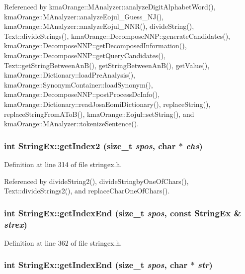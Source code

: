Referenced by kmaOrange::MAnalyzer::analyzeDigitAlphabetWord(), kmaOrange::MAnalyzer::analyzeEojul\_\-Guess\_\-NJ(), kmaOrange::MAnalyzer::analyzeEojul\_\-NNR(), divideString(), Text::divideStrings(), kmaOrange::DecomposeNNP::generateCandidates(), kmaOrange::DecomposeNNP::getDecomposedInformation(), kmaOrange::DecomposeNNP::getQueryCandidates(), Text::getStringBetweenAnB(), getStringBetweenAnB(), getValue(), kmaOrange::Dictionary::loadPreAnalysis(), kmaOrange::SynonymContainer::loadSynonym(), kmaOrange::DecomposeNNP::postProcessDcInfo(), kmaOrange::Dictionary::readJosaEomiDictionary(), replaceString(), replaceStringFromAToB(), kmaOrange::Eojul::setString(), and kmaOrange::MAnalyzer::tokenizeSentence().\hypertarget{classStringEx_85a03ab5f3b7c39a8895fe2c0abfd794}{
\subsubsection[{getIndex2}]{\setlength{\rightskip}{0pt plus 5cm}int StringEx::getIndex2 (size\_\-t {\em spos}, \/  char $\ast$ {\em chs})}}
\label{classStringEx_85a03ab5f3b7c39a8895fe2c0abfd794}




Definition at line 314 of file stringex.h.

Referenced by divideString2(), divideStringbyOneOfChars(), Text::divideStrings2(), and replaceCharOneOfChars().\hypertarget{classStringEx_82f845f34f93c0976c65128787a13251}{
\subsubsection[{getIndexEnd}]{\setlength{\rightskip}{0pt plus 5cm}int StringEx::getIndexEnd (size\_\-t {\em spos}, \/  const {\bf StringEx} \& {\em strex})}}
\label{classStringEx_82f845f34f93c0976c65128787a13251}




Definition at line 362 of file stringex.h.\hypertarget{classStringEx_655d87c51488bec7cf2077301bfcab02}{
\subsubsection[{getIndexEnd}]{\setlength{\rightskip}{0pt plus 5cm}int StringEx::getIndexEnd (size\_\-t {\em spos}, \/  char $\ast$ {\em str})}}
\label{classStringEx_655d87c51488bec7cf2077301bfcab02}




